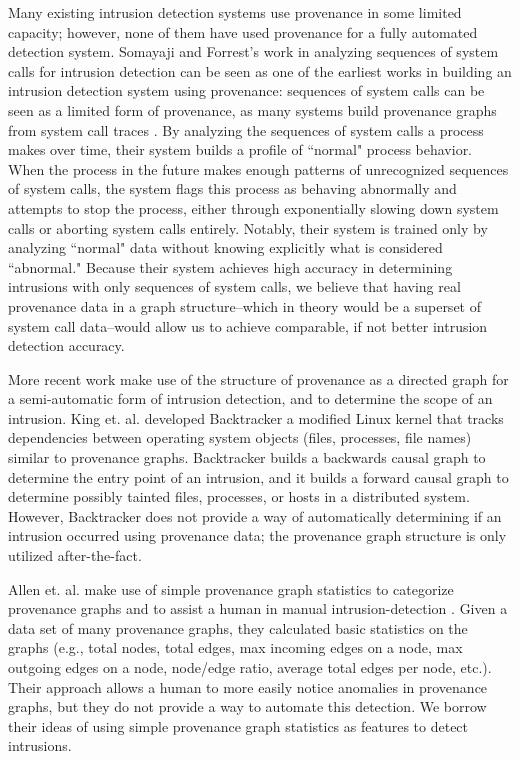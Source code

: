 \documentclass[10pt,twocolumn]{article}
\begin{document}
Many existing intrusion detection systems use provenance in some limited capacity; however, none of them
have used provenance for a fully automated detection system. 
Somayaji and Forrest's work in analyzing sequences of system calls for intrusion detection \cite{somayaji, somayaji-recent} can
be seen as one of the earliest works in building an intrusion detection system using provenance: sequences of
system calls can be seen as a limited form of provenance, as many systems build provenance graphs from
system call traces \cite{spade}. By analyzing the sequences
of system calls a process makes over time, their system builds a profile of ``normal" process behavior. When
the process in the future makes enough patterns of unrecognized sequences of system calls, the system flags
this process as behaving abnormally and attempts to stop the process, either through exponentially slowing down
system calls or aborting system calls entirely. Notably, their system is trained only by analyzing ``normal" data
without knowing explicitly what is considered ``abnormal." Because their system achieves high
accuracy in determining intrusions with only sequences of system calls, we believe that having real provenance
data in a graph structure--which in theory would be a superset of system call data--would allow us
to achieve comparable, if not better intrusion detection accuracy.

More recent work make use of the structure of provenance as a directed graph for a semi-automatic form
of intrusion detection, and to determine the scope of an intrusion. King et. al. developed Backtracker \cite{backtracker}
 a modified
Linux kernel that tracks dependencies between operating system objects (files, processes, file names) similar
to provenance graphs. Backtracker builds a backwards causal graph to determine the entry point of an intrusion,
and it builds a forward causal graph to determine possibly tainted files, processes, or hosts in a distributed
system. However, Backtracker does not provide a way of automatically determining if an intrusion occurred
using provenance data; the provenance graph structure is only utilized after-the-fact.

Allen et. al. make use of simple provenance graph statistics to categorize provenance graphs and to assist a human
in manual intrusion-detection \cite{provstat}. Given a data set of many provenance graphs, they calculated basic statistics
on the graphs (e.g., total nodes, total edges, max incoming edges on a node, max outgoing edges on a node,
node/edge ratio, average total edges per node, etc.). Their approach allows a human to more easily
notice anomalies in provenance graphs, but they do not provide a way to automate this detection.
We borrow their ideas of using simple provenance graph statistics as features to detect intrusions.
\end{document}
